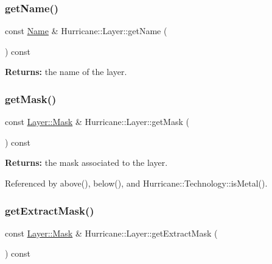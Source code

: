 \subsubsection{\texorpdfstring{get\+Name()}{getName()}}
{\footnotesize\ttfamily const \mbox{\hyperlink{classHurricane_1_1Name}{Name}} \& Hurricane\+::\+Layer\+::get\+Name (\begin{DoxyParamCaption}{ }\end{DoxyParamCaption}) const\hspace{0.3cm}{\ttfamily [inline]}}

{\bfseries Returns\+:} the name of the layer. \mbox{\label{classHurricane_1_1Layer_a29b22c3b59cc24bf82449ad6c068ff1f}} 
\subsubsection{\texorpdfstring{get\+Mask()}{getMask()}}
{\footnotesize\ttfamily const \mbox{\hyperlink{classHurricane_1_1Layer_af5277c670637bd5d910237e7afe01a91}{Layer\+::\+Mask}} \& Hurricane\+::\+Layer\+::get\+Mask (\begin{DoxyParamCaption}{ }\end{DoxyParamCaption}) const\hspace{0.3cm}{\ttfamily [inline]}}

{\bfseries Returns\+:} the mask associated to the layer. 

Referenced by above(), below(), and Hurricane\+::\+Technology\+::is\+Metal().

\mbox{\label{classHurricane_1_1Layer_af009bbd89a8e8260122b7244bfa10349}} 
\subsubsection{\texorpdfstring{get\+Extract\+Mask()}{getExtractMask()}}
{\footnotesize\ttfamily const \mbox{\hyperlink{classHurricane_1_1Layer_af5277c670637bd5d910237e7afe01a91}{Layer\+::\+Mask}} \& Hurricane\+::\+Layer\+::get\+Extract\+Mask (\begin{DoxyParamCaption}{ }\end{DoxyParamCaption}) const\hspace{0.3cm}{\ttfamily [inline]}}

